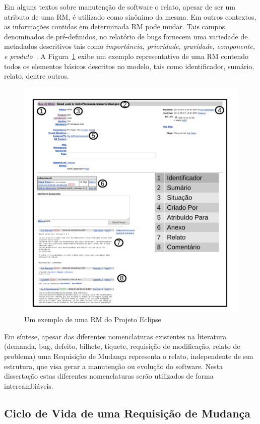 Em alguns textos sobre manutenção de software o relato, apesar de ser um
atributo de uma RM, é utilizado como sinônimo da mesma. Em outros contextos, as
informações contidas em determinada RM pode mudar. Tais campos, denominados de
pré-definidos, no relatório de bugs fornecem uma variedade de metadados
descritivos tais como \textit{importância, prioridade, gravidade, componente, e
	produto}~\cite{zhang2016literature}. A Figura~\ref{fig:rm-exemplo} exibe um
exemplo representativo de uma RM contendo todos os elementos básicos descritos
no modelo, tais como identificador, sumário, relato, dentre outros.

\begin{figure}[htpb]
	\centering
	\includegraphics[width=0.8\linewidth]{./chapter-manutencao-software-visao-geral/img/rm-exemplo.pdf}
	\caption{Um exemplo de uma RM do Projeto Eclipse}
	\label{fig:rm-exemplo}
\end{figure}

Em síntese, apesar das diferentes nomenclaturas existentes na literatura
(demanda, bug, defeito, bilhete, tíquete, requisição de modificação, relato de
problema) uma Requisição de Mudança representa o relato, independente de sua
estrutura, que visa gerar a manutenção ou evolução do software. Nesta
dissertação estas diferentes nomenclaturas serão utilizados de forma
intercambiáveis.


\subsection{Ciclo de Vida de uma Requisição de Mudança}
\label{sub:fluxo_de_trabalho_requisicao_mudanca}

